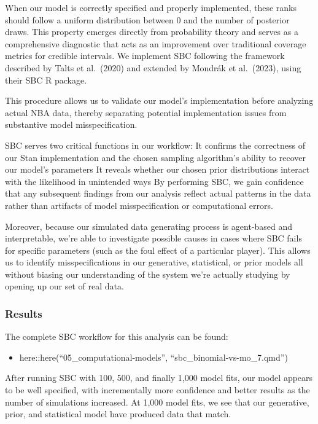 \documentclass[
  letterpaper,
  DIV=11,
  numbers=noendperiod]{scrartcl}
\providecommand{\tightlist}{%
  \setlength{\itemsep}{0pt}\setlength{\parskip}{0pt}}\usepackage{longtable,booktabs,array}
\begin{document}
When our model is correctly specified and properly implemented, these
ranks should follow a uniform distribution between 0 and the number of
posterior draws. This property emerges directly from probability theory
and serves as a comprehensive diagnostic that acts as an improvement
over traditional coverage metrics for credible intervals. We implement
SBC following the framework described by Talts et al.~(2020) and
extended by Mondrák et al.~(2023), using their SBC R package.

This procedure allows us to validate our model's implementation before
analyzing actual NBA data, thereby separating potential implementation
issues from substantive model misspecification.

SBC serves two critical functions in our workflow: It confirms the
correctness of our Stan implementation and the chosen sampling
algorithm's ability to recover our model's parameters It reveals whether
our chosen prior distributions interact with the likelihood in
unintended ways By performing SBC, we gain confidence that any
subsequent findings from our analysis reflect actual patterns in the
data rather than artifacts of model misspecification or computational
errors.

Moreover, because our simulated data generating process is agent-based
and interpretable, we're able to investigate possible causes in cases
where SBC fails for specific parameters (such as the foul effect of a
particular player). This allows us to identify misspecifications in our
generative, statistical, or prior models all without biasing our
understanding of the system we're actually studying by opening up our
set of real data.

\subsubsection{Results}\label{results}

The complete SBC workflow for this analysis can be found:

\begin{itemize}
\tightlist
\item
  here::here(``05\_computational-models'',
  ``sbc\_binomial-vs-mo\_7.qmd'')
\end{itemize}

After running SBC with 100, 500, and finally 1,000 model fits, our model
appears to be well specified, with incrementally more confidence and
better results as the number of simulations increased. At 1,000 model
fits, we see that our generative, prior, and statistical model have
produced data that match.
\end{document}
